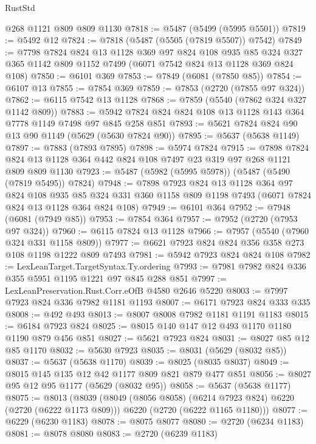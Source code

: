 \begin{lexlean}{RustStd}
\begin{coremodule}
    @268
    @1121
    @809
    @809
    @1130
@7818 := @5487 (@5499 (@5995 @5501))
@7819 := @5492 @12
@7824 := @7818 (@5487 (@5505 (@7819 @5507)) @7542)
@7849 := @7798
    @7824
    @824
    @13
    @1128
    @369
    @97
    @824
    @108
    @935
    @85
    @324
    @327
    @365
    @1142
    @809
    @1152
    @7499
    (@6071 @7542 @824 @13 @1128 @369 @824 @108)
@7850 := @6101 @369
@7853 := @7849 (@6081 (@7850 @85))
@7854 := @6107 @13
@7855 := @7854 @369
@7859 := @7853 (@2720 (@7855 @97 @324))
@7862 := @6115 @7542 @13 @1128
@7868 := @7859 (@5540 (@7862 @324 @327 @1142 @809))
@7883 := @5942 @7824 @824 @824 @108 @13 @1128 @143 @364 @7778 @1149 @7498 @97 @845 @258 @851
@7893 := @5621 @7824 @824 @90 @13 @90 @1149 (@5629 (@5630 @7824 @90))
@7895 := @5637 (@5638 @1149)
@7897 := @7883 (@7893 @7895)
@7898 := @5974 @7824
@7915 := @7898
    @7824
    @824
    @13
    @1128
    @364
    @442
    @824
    @108
    @7497
    @23
    @319
    @97
    @268
    @1121
    @809
    @809
    @1130
@7923 := @5487 (@5982 (@5995 @5978)) (@5487 (@5490 (@7819 @5495)) @7824)
@7948 := @7898
    @7923
    @824
    @13
    @1128
    @364
    @97
    @824
    @108
    @935
    @85
    @324
    @331
    @360
    @1158
    @809
    @1198
    @7493
    (@6071 @7824 @824 @13 @1128 @364 @824 @108)
@7949 := @6101 @364
@7952 := @7948 (@6081 (@7949 @85))
@7953 := @7854 @364
@7957 := @7952 (@2720 (@7953 @97 @324))
@7960 := @6115 @7824 @13 @1128
@7966 := @7957 (@5540 (@7960 @324 @331 @1158 @809))
@7977 := @6621 @7923 @824 @824 @356 @358 @273 @108 @1198 @1222 @809 @7493
@7981 := @5942 @7923 @824 @824 @108
@7982 := LexLeanTarget.TargetSyntax.Ty.ordering
@7993 := @7981 @7982 @824 @336 @355 @5951 @1195 @1221 @97 @845 @288 @851
@7997 := LexLeanPreservation.Rust.Corr.eOfB @4580 @2646 @5220
@8003 := @7997 @7923 @824 @336 @7982 @1181 @1193
@8007 := @6171 @7923 @824 @333 @335
@8008 := @492 @493
@8013 := @8007 @8008 @7982 @1181 @1191 @1183
@8015 := @6184 @7923 @824
@8025 := @8015 @140 @147 @12 @493 @1170 @1180 @1190 @879 @456 @851
@8027 := @5621 @7923 @824
@8031 := @8027 @85 @12 @85 @1170
@8032 := @5630 @7923
@8035 := @8031 (@5629 (@8032 @85))
@8037 := @5637 (@5638 @1170)
@8039 := @8025 (@8035 @8037)
@8049 := @8015 @145 @135 @12 @42 @1177 @809 @821 @879 @477 @851
@8056 := @8027 @95 @12 @95 @1177 (@5629 (@8032 @95))
@8058 := @5637 (@5638 @1177)
@8075 := @8013
    (@8039
      (@8049 (@8056 @8058) (@6214 @7923 @824) @6220 (@2720 (@6222 @1173 @809)))
      @6220
      (@2720 (@6222 @1165 @1180)))
@8077 := @6229 (@6230 @1183)
@8078 := @8075 @8077
@8080 := @2720 (@6234 @1183)
@8081 := @8078 @8080
@8083 := @2720 (@6239 @1183)

\end{coremodule}
\end{lexlean}
